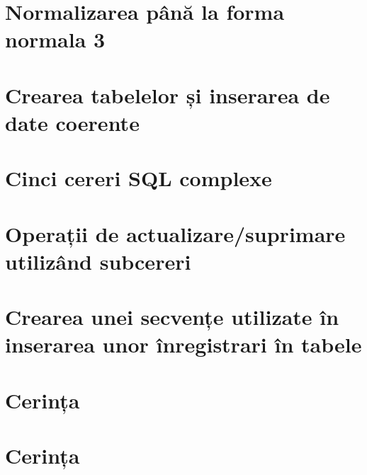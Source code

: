 \documentclass[a4paper,oneside, 12pt]{article}
\begin{document}
\section{Normalizarea până la forma normala 3}

\section{Crearea tabelelor și inserarea de date coerente}





\section{Cinci cereri SQL complexe}

\begin{center}

\minipage{\linewidth}

\endminipage

\minipage{\linewidth}

\endminipage

\minipage{\linewidth}

\endminipage

\minipage{\linewidth}

\endminipage

\minipage{\linewidth}

\endminipage

\end{center}

\section{Operații de actualizare/suprimare utilizând subcereri}

\minipage{\linewidth}

\endminipage

\section{Crearea unei secvențe utilizate în inserarea unor înregistrari în tabele}

\minipage{\linewidth}

\endminipage

\section{Cerința}
\section{Cerința}
\end{document}

